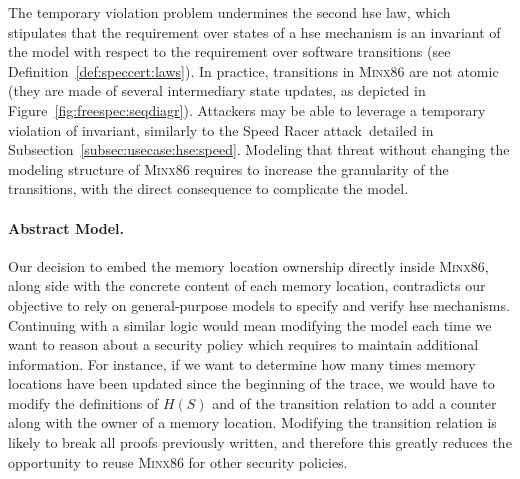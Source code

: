 The temporary violation problem undermines the second \ac{hse} law, which
stipulates that the requirement over states of a \ac{hse} mechanism is an
invariant of the model with respect to the requirement over software transitions
(see Definition~\ref{def:speccert:laws}).
%
In practice, transitions in {\scshape Minx86} are not atomic (they are made of
several intermediary state updates, as depicted in
Figure~\ref{fig:freespec:seqdiagr}).
%
Attackers may be able to leverage a temporary violation of invariant, similarly
to the Speed Racer attack\,\cite{kallenberg2015racecondition} detailed in
Subsection~\ref{subsec:usecase:hse:speed}.
%
Modeling that threat without changing the modeling structure of {\scshape
  Minx86} requires to increase the granularity of the transitions, with the
direct consequence to complicate the model.

\paragraph{Abstract Model.}
%
Our decision to embed the memory location ownership directly inside {\scshape
  Minx86}, along side with the concrete content of each memory location,
contradicts our objective to rely on general-purpose models to specify and
verify \ac{hse} mechanisms.
%
Continuing with a similar logic would mean modifying the model each time we want
to reason about a security policy which requires to maintain additional
information.
%
For instance, if we want to determine how many times memory locations have been
updated since the beginning of the trace, we would have to modify the
definitions of \( H(S) \) and of the transition relation to add a counter along
with the owner of a memory location.
%
Modifying the transition relation is likely to break all proofs previously
written, and therefore this greatly reduces the opportunity to reuse {\scshape
  Minx86} for other security policies.
%


